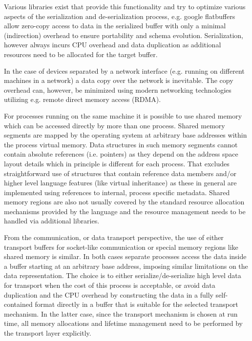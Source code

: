\documentclass[a4paper,twoside]{article}
\begin{document}
Various libraries exist that provide this functionality and try to optimize various aspects of the serialization and de-serialization process, e.g. google flatbuffers\cite{flatbuffers} allow zero-copy access to data in the serialized buffer with only a minimal (indirection) overhead to ensure portability and schema evolution. Serialization, however always incurs CPU overhead and data duplication as additional resources need to be allocated for the target buffer.

In the case of devices separated by a network interface (e.g. running on different machines in a network) a data copy over the network is inevitable. The copy overhead can, however, be minimized using modern networking technologies utilizing e.g. remote direct memory access (RDMA).

For processes running on the same machine it is possible to use shared memory which can be accessed directly by more than one process.
Shared memory segments are mapped by the operating system at arbitrary base addresses within the process virtual memory. Data structures in such memory segments cannot contain absolute references (i.e. pointers) as they depend on the address space layout details which in principle is different for each process.
That excludes straightforward use of structures that contain reference data members and/or higher level language features (like virtual inheritance) as these in general are implemented using references to internal, process specific metadata.
Shared memory regions are also not usually covered by the standard resource allocation mechanisms provided by the language and the resource management needs to be handled via additional libraries.

From the communication, or data transport perspective, the use of either transport buffers for socket-like communication or special memory regions like shared memory is similar. In both cases separate processes access the data inside a buffer starting at an arbitrary base address, imposing similar limitations on the data representation.
The choice is to either serialize/de-serialize high level data for transport when the cost of this process is acceptable, or avoid data duplication and the CPU overhead by constructing the data in a fully self-contained format directly in a buffer that is suitable for the selected transport mechanism. In the latter case, since the transport mechanism is chosen at run time, all memory allocations and lifetime management need to be performed by the transport layer explicitly.
\end{document}

